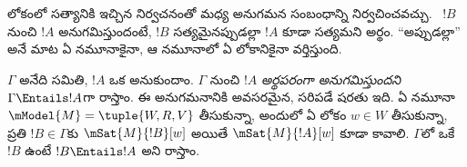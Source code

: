 \documentclass[../../../include/open-logic-section]{subfiles}
\begin{document}


\begin{explain}
  లోకంలో సత్యానికి ఇచ్చిన నిర్వచనంతో 
  మధ్య అనుగమన సంబంధాన్ని నిర్వచించవచ్చు. ~$!B$
  నుంచి $!A$ అనుగమిస్తుందంటే, $!B$ సత్యమైనప్పుడల్లా $!A$ కూడా
  సత్యమని అర్థం. “అప్పుడల్లా” అనే మాట ఏ నమూనాకైనా,
  ఆ నమూనాలో ఏ లోకానికైనా వర్తిస్తుంది.
\end{explain}

\begin{defn}
  $\Gamma$ అనేది  సమితి,
  $!A$ ఒక  అనుకుందాం.
  $\Gamma$ నుంచి $!A$ \emph{అర్థపరంగా అనుగమిస్తుందని}
  $\Gamma \Entails !A$గా రాస్తాం. ఈ అనుగమనానికి అవసరమైన,
  సరిపడే షరతు ఇది. ఏ నమూనా $\mModel{M} = \tuple{W, R, V}$
  తీసుకున్నా, అందులో ఏ లోకం $w \in W$ తీసుకున్నా, ప్రతి $!B \in \Gamma$కు
  $\mSat{M}{!B}[w]$ అయితే $\mSat{M}{!A}[w]$ కూడా కావాలి.
  $\Gamma$లో ఒకే ~$!B$
  ఉంటే $!B \Entails !A$ అని రాస్తాం.
\end{defn}
\end{document}
